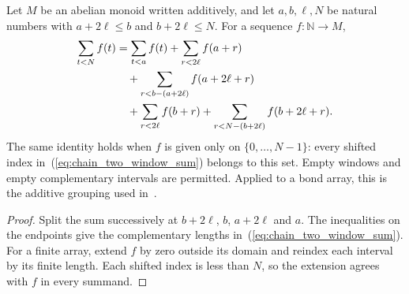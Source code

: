 \begin{lemma}
    \label{thm:chain_two_window_sum}
    \leanok
    Let $M$ be an abelian monoid written additively, and let
    $a,b,\ell,N$ be natural numbers with $a+2\ell\le b$ and
    $b+2\ell\le N$. For a sequence $f:\mathbb N\to M$,
    \begin{align}
        \sum_{t<N}f(t)
         & =\sum_{t<a}f(t)+\sum_{r<2\ell}f(a+r)\notag   \\
         & \quad+\sum_{r<b-(a+2\ell)}f(a+2\ell+r)\notag \\
         & \quad+\sum_{r<2\ell}f(b+r)
        +\sum_{r<N-(b+2\ell)}f(b+2\ell+r).
        \label{eq:chain_two_window_sum}
    \end{align}
    The same identity holds when $f$ is given only on
    $\{0,\ldots,N-1\}$: every shifted index in~(\ref{eq:chain_two_window_sum})
    belongs to this set. Empty windows and empty complementary intervals
    are permitted. Applied to a bond array, this is the additive grouping
    used in~\cite[Section~4.1]{Arad2016RigorousRG}.
\end{lemma}
\begin{proof}\leanok
    Split the sum successively at $b+2\ell$, $b$, $a+2\ell$ and $a$.
    The inequalities on the endpoints give the complementary lengths
    in~(\ref{eq:chain_two_window_sum}). For a finite array, extend $f$ by zero
    outside its domain and reindex each interval by its finite length.
    Each shifted index is less than $N$, so the extension agrees with $f$
    in every summand.
\end{proof}

